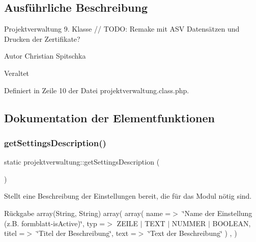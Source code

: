 \subsection{Ausführliche Beschreibung}
Projektverwaltung 9. Klasse // T\+O\+DO\+: Remake mit A\+SV Datensätzen und Drucken der Zertifikate? \begin{DoxyAuthor}{Autor}
Christian Spitschka 
\end{DoxyAuthor}
\begin{DoxyRefDesc}{Veraltet}
\item[\mbox{\hyperlink{deprecated__deprecated000041}{Veraltet}}]\end{DoxyRefDesc}


Definiert in Zeile 10 der Datei projektverwaltung.\+class.\+php.



\subsection{Dokumentation der Elementfunktionen}
\mbox{\label{classprojektverwaltung_a3320441fd0e3bf2d936778c4e7776fa9}} 
\subsubsection{\texorpdfstring{get\+Settings\+Description()}{getSettingsDescription()}}
{\footnotesize\ttfamily static projektverwaltung\+::get\+Settings\+Description (\begin{DoxyParamCaption}{ }\end{DoxyParamCaption})\hspace{0.3cm}{\ttfamily [static]}}

Stellt eine Beschreibung der Einstellungen bereit, die für das Modul nötig sind. \begin{DoxyReturn}{Rückgabe}
array(\+String, String) array( array( \textquotesingle{}name\textquotesingle{} =$>$ \char`\"{}\+Name der Einstellung (z.\+B. formblatt-\/is\+Active)\char`\"{}, \textquotesingle{}typ\textquotesingle{} =$>$ Z\+E\+I\+LE $\vert$ T\+E\+XT $\vert$ N\+U\+M\+M\+ER $\vert$ B\+O\+O\+L\+E\+AN, \textquotesingle{}titel\textquotesingle{} =$>$ \char`\"{}\+Titel der Beschreibung\char`\"{}, \textquotesingle{}text\textquotesingle{} =$>$ \char`\"{}\+Text der Beschreibung\char`\"{} ) , ) 
\end{DoxyReturn}


